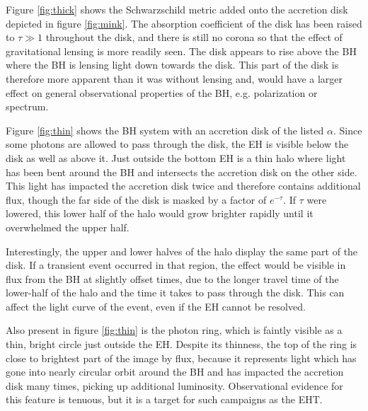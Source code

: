 \documentclass[twocolumn,twocolappendix]{aastex631}
\begin{document}
Figure \ref{fig:thick} shows the Schwarzschild metric added onto the accretion disk depicted in figure \ref{fig:mink}. The absorption coefficient of the disk has been raised to $\tau \gg 1$ throughout the disk, and there is still no corona so that the effect of gravitational lensing is more readily seen. The disk appears to rise above the BH where the BH is lensing light down towards the disk. This part of the disk is therefore more apparent than it was without lensing and, would have a larger effect on general observational properties of the BH, e.g. polarization or spectrum.

Figure \ref{fig:thin} shows the BH system with an accretion disk of the listed $\alpha$. Since some photons are allowed to pass through the disk, the EH is visible below the disk as well as above it. Just outside the bottom EH is a thin halo where light has been bent around the BH and intersects the accretion disk on the other side. This light has impacted the accretion disk twice and therefore contains additional flux, though the far side of the disk is masked by a factor of $e^{-\tau}$. If $\tau$ were lowered, this lower half of the halo would grow brighter rapidly until it overwhelmed the upper half.

Interestingly, the upper and lower halves of the halo display the same part of the disk. If a transient event occurred in that region, the effect would be visible in flux from the BH at slightly offset times, due to the longer travel time of the lower-half of the halo and the time it takes to pass through the disk. This can affect the light curve of the event, even if the EH cannot be resolved.

Also present in figure \ref{fig:thin} is the photon ring, which is faintly visible as a thin, bright circle just outside the EH. Despite its thinness, the top of the ring is close to brightest part of the image by flux, because it represents light which has gone into nearly circular orbit around the BH and has impacted the accretion disk many times, picking up additional luminosity. Observational evidence for this feature is tenuous, but it is a target for such campaigns as the EHT.
\end{document}
